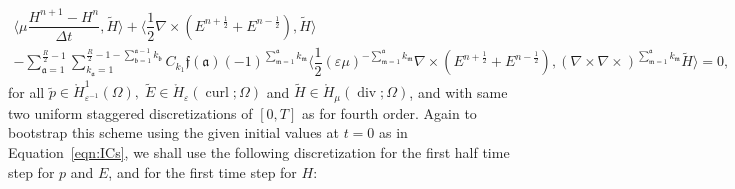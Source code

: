 \documentclass{amsart}
\theoremstyle{thmstyleone}%
\theoremstyle{thmstyletwo}%
\theoremstyle{thmstylethree}%
\DeclareMathOperator{\curl}{curl}
\def\divgn{\operatorname{div}}
\newcommand{\aInnerproduct}[2]{\bigl\langle #1, #2 \bigr\rangle}
\begin{document}
\begin{subequations}
      \begin{multline}
  \aInnerproduct{\mu \dfrac{H^{n + 1} - H^n}{\Delta t}}{\widetilde{H}} +  \aInnerproduct{\dfrac{1}{2} \nabla \times \left( E^{n + \frac{1}{2}} + E^{n - \frac{1}{2}} \right)}{\widetilde{H}} \\ - \sum\limits_{\mathfrak{a} = 1}^{\frac{R}{2} - 1} \sum\limits_{k_\mathfrak{a} = 1}^{\frac{R}{2} - 1 - \sum\limits_{\mathfrak{b} = 1}^{\mathfrak{a} - 1} k_\mathfrak{b}} C_{k_1} \mathfrak{f}(\mathfrak{a}) (-1)^{\sum\limits_{\mathfrak{m} = 1}^\mathfrak{a} k_\mathfrak{m}} \aInnerproduct{\dfrac{1}{2} (\varepsilon \mu)^{-\sum\limits_{\mathfrak{m} = 1}^\mathfrak{a} k_\mathfrak{m}} \nabla \times \left( E^{n + \frac{1}{2}} + E^{n - \frac{1}{2}} \right)}{\left( \nabla \times  \nabla \times \right)^{\sum\limits_{\mathfrak{m} = 1}^\mathfrak{a} k_\mathfrak{m}} \widetilde{H}} = 0, \label{eqn:maxwell_H_lfR}
       \end{multline}
\end{subequations}
for all $\widetilde{p} \in \mathring{H}^1_{\varepsilon^{-1}}(\Omega), \; \widetilde{E} \in \mathring{H}_{\varepsilon}(\curl; \Omega)$ and $\widetilde{H} \in \mathring{H}_{\mu}(\divgn; \Omega)$, and with same two uniform staggered discretizations of $[0, T]$ as for fourth order. Again to bootstrap this scheme using the given initial values at $t = 0$ as in Equation~\eqref{eqn:ICs}, we shall use the following discretization for the first half time step for $p$ and $E$, and for the first time step for $H$:
\end{document}
